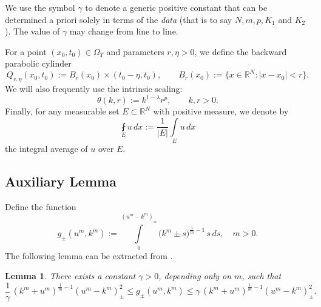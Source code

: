 \documentclass[a4paper,11pt,fullpage]{article}
\numberwithin{equation}{section}
\newtheorem{lemma}{Lemma}[section]
\begin{document}
We use the symbol $\gamma$ to denote a generic positive constant that can be
determined a priori solely in terms of the {\it data} (that is to say $N,m,p,K_1$ and $K_2$). The value of $\gamma$ may change from line to line.

\medskip
\noindent For a point $(x_0,t_0)\in\Omega_T$ and parameters $r,\eta>0$, we define the backward
parabolic cylinder
\begin{equation*}
Q_{r,\eta}(x_0,t_0):=B_r(x_0)\times(t_0-\eta,t_0),\qquad B_r(x_0):=\{x\in\mathbb{R}^N:|x-x_0|< r\}.
\end{equation*}
We will also frequently use the intrinsic scaling:
\begin{equation*}
\theta(k,r):=k^{1-\lambda}r^p, \qquad k,r>0.
\end{equation*}
Finally, for any measurable set $E\subset\mathbb{R}^{N}$ with positive measure, we denote by
\begin{equation*}
\fint\limits_E u\,dx:=\frac{1}{|E|}\int\limits_E u\,dx
\end{equation*}
the integral average of $u$ over $E$.

\subsection{Auxiliary Lemma}

Define the function
$$g_{\pm}(u^{m}, k^{m}):=\int\limits^{(u^{m}-k^{m})_{\pm}}_0\big(k^{m}\pm s\big)^{\frac{1}{m}-1}\,s\,ds,\quad m>0.$$
The following lemma can be extracted from \cite[Lemma~3.2]{BogDuzGiaLiaSch}.

\begin{lemma}\label{lem2.1}
There exists a constant $\gamma>0$, depending only on $m$, such that
\begin{equation*}
\frac{1}{\gamma}\,(k^m+u^m)^{\frac{1}{m}-1}(u^m-k^m)^2_{\pm}\leqslant g_{\pm}(u^m, k^m)\leqslant \gamma\, (k^m+u^m)^{\frac{1}{m}-1}(u^m-k^m)^2_{\pm}.
\end{equation*}
\end{lemma}
\end{document}
